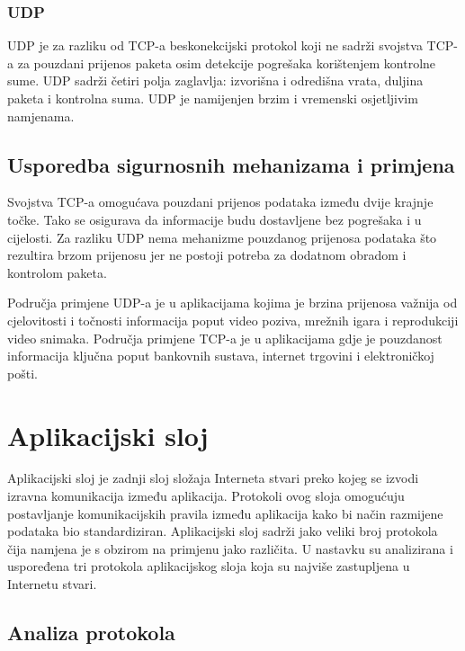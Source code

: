 \documentclass[times, utf8, diplomski]{fer}
\begin{document}
\subsubsection{UDP}
UDP je za razliku od TCP-a beskonekcijski protokol koji ne sadrži svojstva TCP-a za pouzdani prijenos paketa osim detekcije pogrešaka korištenjem kontrolne sume. UDP sadrži četiri polja zaglavlja: izvorišna i odredišna vrata, duljina paketa i kontrolna suma. UDP je namijenjen brzim i vremenski osjetljivim namjenama.

\subsection{Usporedba sigurnosnih mehanizama i primjena}
Svojstva TCP-a omogućava pouzdani prijenos podataka između dvije krajnje točke. Tako se osigurava da informacije budu dostavljene bez pogrešaka i u cijelosti. Za razliku UDP nema mehanizme pouzdanog prijenosa podataka što rezultira brzom prijenosu jer ne postoji potreba za dodatnom obradom i kontrolom paketa. 

Područja primjene UDP-a je u aplikacijama kojima je brzina prijenosa važnija od cjelovitosti i točnosti informacija poput video poziva, mrežnih igara i reprodukciji video snimaka. Područja primjene TCP-a je u aplikacijama gdje je pouzdanost informacija ključna poput bankovnih sustava, internet trgovini i elektroničkoj pošti.

\section{Aplikacijski sloj}
Aplikacijski sloj je zadnji sloj složaja Interneta stvari preko kojeg se izvodi izravna komunikacija između aplikacija. Protokoli ovog sloja omogućuju postavljanje komunikacijskih pravila između aplikacija kako bi način razmijene podataka bio standardiziran. Aplikacijski sloj sadrži jako veliki broj protokola čija namjena je s obzirom na primjenu jako različita. U nastavku su analizirana i uspoređena tri protokola aplikacijskog sloja koja su najviše zastupljena u Internetu stvari.

\subsection{Analiza protokola}
\end{document}

